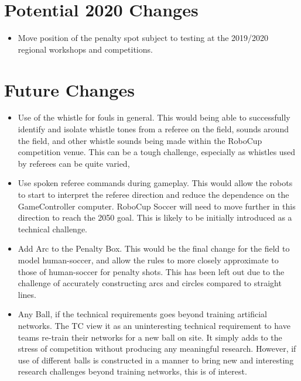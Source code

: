 \documentclass[12pt]{article}
\begin{document}
\section{Potential 2020 Changes}
\begin{itemize}
  \item Move position of the penalty spot subject to testing at the 2019/2020 regional workshops and competitions.
\end{itemize}

\section{Future Changes}
\label{sec:future_changes}
\begin{itemize}
  \item Use of the whistle for fouls in general. This would being able to successfully identify and isolate whistle tones from a referee on the field, sounds around the field, and other whistle sounds being made within the RoboCup competition venue. This can be a tough challenge, especially as whistles used by referees can be quite varied,
  \item Use spoken referee commands during gameplay. This would allow the robots to start to interpret the referee direction and reduce the dependence on the GameController computer. RoboCup Soccer will need to move further in this direction to reach the 2050 goal. This is likely to be initially introduced as a technical challenge.
  \item Add Arc to the Penalty Box. This would be the final change for the field to model human-soccer, and allow the rules to more closely approximate to those of human-soccer for penalty shots. This has been left out due to the challenge of accurately constructing arcs and circles compared to straight lines.
  \item Any Ball, if the technical requirements goes beyond training artificial networks. The TC view it as an uninteresting technical requirement to have teams re-train their networks for a new ball on site. It simply adds to the stress of competition without producing any meaningful research. However, if use of different balls is constructed in a manner to bring new and interesting research challenges beyond training networks, this is of interest.
\end{itemize}
\end{document}
